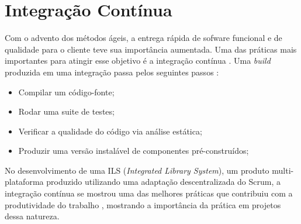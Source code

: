\section{Integração Contínua}

Com o advento dos métodos ágeis, a entrega rápida de sofware funcional e de qualidade para o cliente teve sua importância aumentada. Uma das práticas mais importantes para atingir esse objetivo é a integração contínua \cite{continuous-integration}. Uma \textit{build} produzida em uma integração passa pelos seguintes passos \cite{continuous-integration}:
\begin{itemize}
\item Compilar um código-fonte;
\item Rodar uma suite de testes; 
\item Verificar a qualidade do código via análise estática;
\item Produzir uma versão instalável de componentes pré-construídos; 
\end{itemize}
No desenvolvimento de uma ILS (\textit{Integrated Library System}), um produto multi-plataforma produzido utilizando uma adaptação descentralizada do Scrum, a integração contínua se mostrou uma das melhores práticas que contribuiu com a produtividade do trabalho \cite{sutherland}, mostrando a importância da prática em projetos dessa natureza.
